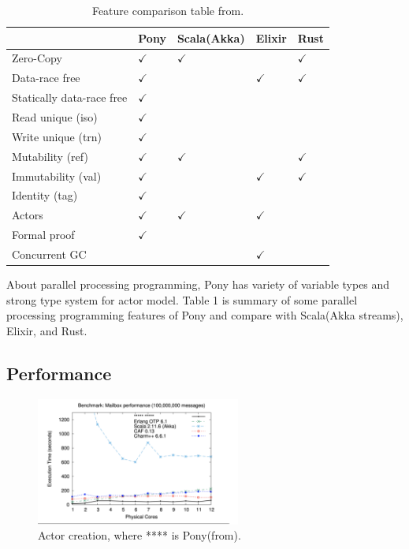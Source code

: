\documentclass{article}
\begin{document}
\begin{multicols}{2}
\begin{table}[]
\centering
\begin{tabular}{lllll}
\hline
                          & Pony & Scala(Akka) & Elixir & Rust \\ \hline \hline
Zero-Copy                 & $\checkmark$ & $\checkmark$& &  $\checkmark$    \\ \hline
Data-race free            & $\checkmark$ &       & $\checkmark$& $\checkmark$ \\ \hline
Statically data-race free & $\checkmark$ &       &        &      \\ \hline
Read unique (iso)         & $\checkmark$&       &        &      \\ \hline
Write unique (trn)        & $\checkmark$&       &        &      \\ \hline
Mutability (ref)          &$\checkmark$ &$\checkmark$ &        &$\checkmark$ \\ \hline
Immutability (val)        &$\checkmark$&       & $\checkmark$& $\checkmark$\\ \hline
Identity (tag)            &$\checkmark$&       &        &      \\ \hline
Actors                    &$\checkmark$& $\checkmark$ & $\checkmark$&      \\ \hline
Formal proof              &$\checkmark$&       &        &      \\ \hline
Concurrent GC          & &       &   $\checkmark$     &      \\ \hline
\end{tabular}
\caption{Feature comparison table from\cite{type-proof-paper}.}
\end{table}


About parallel processing programming, Pony has variety of variable types and strong type system for actor model.
Table 1 is summary of some parallel processing programming features of Pony and compare with Scala(Akka streams\cite{akka-streams}), Elixir, and Rust.

\subsection{Performance}


\begin{figure}
\centering 		\includegraphics[width=0.6\textwidth]{a}
\caption{Actor creation, where **** is Pony(from\cite{type-proof-paper}).}
\end{figure}




\end{multicols}
\end{document}
